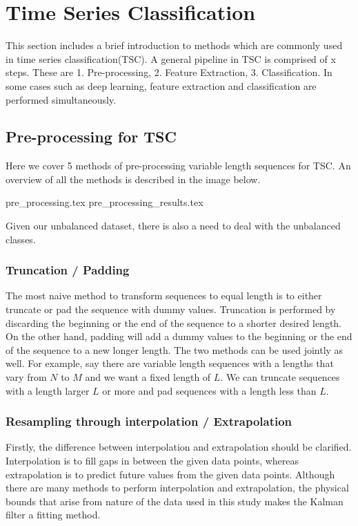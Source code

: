 \section{Time Series Classification}
This section includes a brief introduction to methods which are commonly used in time series classification(TSC). A general pipeline in TSC is comprised of x steps. These are 1. Pre-processing, 2. Feature Extraction, 3. Classification. In some cases such as deep learning, feature extraction and classification are performed simultaneously. 

\subsection{Pre-processing for TSC}

Here we cover 5 methods of pre-processing variable length sequences for TSC. An overview of all the methods is described in the image below.

{pre_processing.tex}
{pre_processing_results.tex}

Given our unbalanced dataset, there is also a need to deal with the unbalanced classes. 

\subsubsection{Truncation / Padding}
The most naive method to transform sequences to equal length is to either truncate or pad the sequence with dummy values. Truncation is performed by discarding the beginning or the end of the sequence to a shorter desired length. On the other hand, padding will add a dummy values to the beginning or the end of the sequence to a new longer length. The two methods can be used jointly as well. For example, say there are variable length sequences with a lengths that vary from $N$ to $M$ and we want a fixed length of $L$. We can truncate sequences with a length larger $L$ or more and pad sequences with a length less than $L$.

\subsubsection{Resampling through interpolation / Extrapolation}
Firstly, the difference between interpolation and extrapolation should be clarified. Interpolation is to fill gaps in between the given data points, whereas extrapolation is to predict future values from the given data points. 
Although there are many methods to perform interpolation and extrapolation, the physical bounds that arise from nature of the data used in this study makes the Kalman filter a fitting method. 

